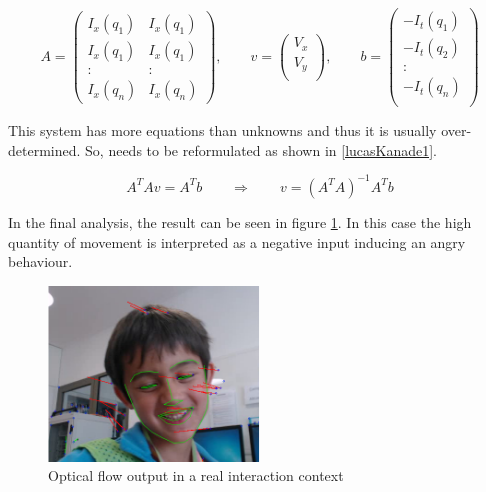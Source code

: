 \begin{equation} \label{lucasKanade}
A =  \left( \begin{array}{cc}
	I_x(q_1) & I_x(q_1) \\
	I_x(q_1) & I_x(q_1) \\
	\colon & \colon  \\
	I_x(q_n) & I_x(q_n)
	\end{array} \right),
\qquad  
v =  \left( \begin{array}{cc}
		V_x  \\
		V_y \\
	\end{array} \right),
\qquad	 	 
b =  \left( \begin{array}{c}
	 		-I_t(q_1)\\
	 		-I_t(q_2)\\
	 		\colon \\
	 		-I_t(q_n)\\
	 \end{array} \right)
\end{equation}

This system has more equations than unknowns and thus it is usually over-determined. So, needs to be reformulated as shown in \ref{lucasKanade1}. 

\begin{equation} \label{lucasKanade1}
A^TAv = A^Tb
\qquad
\Rightarrow
\qquad
v=(A^TA)^{-1}A^Tb
\end{equation}

In the final analysis, the result can be seen in figure \ref{fig:optical}. In this case the high quantity of movement is interpreted as a negative input inducing an angry behaviour.

\begin{figure}[h!]
        \centering
        \includegraphics[width=0.5\textwidth]{figures/optical.png}
        \caption{Optical flow output in a real interaction context}
        \label{fig:optical}
\end{figure}

